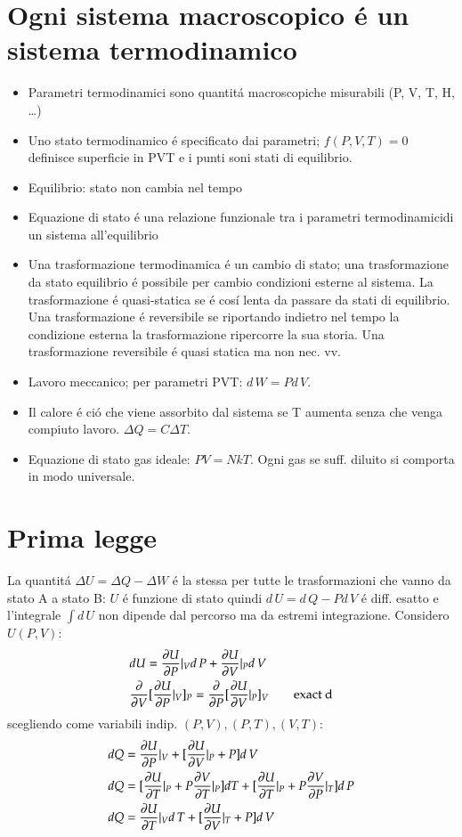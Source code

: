     \chapter{Ogni sistema macroscopico \'e un sistema termodinamico}
        \begin{itemize}
        \item Parametri termodinamici sono quantit\'a macroscopiche misurabili (P, V, T, H, \ldots)
        \item Uno stato termodinamico \'e specificato dai parametri; $f(P,V,T)=0$ definisce superficie in PVT e i punti soni stati di equilibrio.
        \item Equilibrio: stato non cambia nel tempo
        \item Equazione di stato \'e una relazione funzionale tra i parametri termodinamicidi un sistema all'equilibrio
        \item Una trasformazione termodinamica \'e un cambio di stato; una trasformazione da stato equilibrio \'e possibile per cambio condizioni esterne al sistema. La trasformazione \'e quasi-statica se \'e cos\'i lenta da passare da stati di equilibrio. Una trasformazione \'e reversibile se riportando indietro nel tempo la condizione esterna la trasformazione ripercorre la sua storia. Una trasformazione reversibile \'e quasi statica ma non nec. vv.
        \item Lavoro meccanico; per parametri PVT: $d\,W=Pd\,V$.
        \item Il calore \'e ci\'o che viene assorbito dal sistema se T aumenta senza che venga compiuto lavoro. $\Delta Q=C\Delta T$.
        \item Equazione di stato gas ideale: $PV=NkT$. Ogni gas se suff. diluito si comporta in modo universale.
        \end{itemize}
    \chapter{Prima legge}
        La quantit\'a $\Delta U=\Delta Q-\Delta W$ \'e la stessa per tutte le trasformazioni che vanno da stato A a stato B: $U$ \'e funzione di stato quindi $d\,U=d\,Q-Pd\,V$ \'e diff. esatto e l'integrale $\int d\,U$ non dipende dal percorso ma da estremi integrazione. Considero $U(P,V)$:
        \begin{align*}
        &dU=\PDy{P}{U}|_Vd\,P+\PDy{V}{U}|_Pd\,V\\
        &\PDof{V}[\PDy{P}{U}|_V]_P=\PDof{P}[\PDy{V}{U}|_P]_V\tag*{exact d}
        \end{align*}
        scegliendo come variabili indip. $(P,V), (P,T), (V,T)$:
        \begin{align*}
            &dQ=\PDy{P}{U}|_V+[\PDy{V}{U}|_P+P]d\,V\\
            &dQ=[\PDy{T}{U}|_P+P\PDy{T}{V}|_P]dT+[\PDy{T}{U}|_P+P\PDy{P}{V}|_T]d\,P\\
            &dQ=\PDy{T}{U}|_Vd\,T+[\PDy{V}{U}|_T+P]d\,V
        \end{align*}
